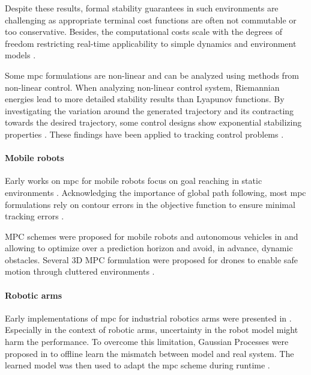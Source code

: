 Despite these results, formal stability
guarantees in such environments are challenging as appropriate terminal cost
functions are often not commutable or too conservative. Besides, the
computational costs scale with the degrees of freedom restricting real-time
applicability to simple dynamics and environment models \cite{Spahn2021}.

Some \ac{mpc} formulations are non-linear and can be analyzed
using methods from non-linear control. When analyzing non-linear control
system, Riemannian energies lead to more detailed stability results than
Lyapunov functions. By investigating the variation around the generated
trajectory and its contracting towards the desired trajectory, some control
designs show exponential stabilizing properties \cite{l2}. These
findings have been applied to tracking control problems \cite{l3}.

\paragraph{Mobile robots}

Early works on \ac{mpc} for mobile robots focus on goal
reaching in static environments \cite{howard2010receding}.
Acknowledging the importance of global path following, most
\ac{mpc} formulations rely on contour errors in the
objective function to ensure minimal tracking errors
\cite{lam2010model,brown2017safe}.

MPC schemes were proposed for mobile robots and autonomous vehicles in
\cite{Brito2019} and \cite{Schwarting2018} allowing to optimize over a
prediction horizon and avoid, in advance, dynamic obstacles.  Several 3D MPC
formulation were proposed for drones to enable safe motion through cluttered
environments \cite{Tordesillas2019,Liu2017}.

\paragraph{Robotic arms}

Early implementations of \ac{mpc} for industrial robotics
arms were presented in \cite{faulwasser2016implementation}.
Especially in the context of robotic arms, uncertainty in
the robot model might harm the performance. To overcome this
limitation, Gaussian Processes were proposed in
\cite{hewing2019cautious,carron2019data} to offline learn
the mismatch between model and real system. The learned
model was then used to adapt the \ac{mpc} scheme during
runtime \cite{carron2019data}.

